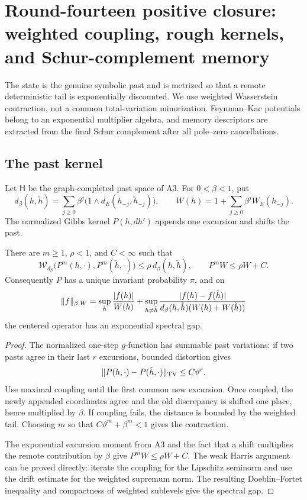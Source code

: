 
\section{Round-fourteen positive closure: weighted coupling, rough kernels, and Schur-complement memory}
\label{sec:r14-a4}

The state is the genuine symbolic past and is metrized so that a remote
deterministic tail is exponentially discounted.  We use weighted Wasserstein
contraction, not a common total-variation minorization.  Feynman--Kac
potentials belong to an exponential multiplier algebra, and memory
descriptors are extracted from the final Schur complement after all
pole--zero cancellations.

\subsection{The past kernel}

Let \(\mathsf H\) be the graph-completed past space of A3.  For
\(0<\beta<1\), put
\[
 d_\beta(h,\tilde h)
 =\sum_{j\ge0}\beta^j
  \bigl(1\wedge d_E(h_{-j},\tilde h_{-j})\bigr),
 \qquad
 W(h)=1+\sum_{j\ge0}\beta^jW_E(h_{-j}).
\]
The normalized Gibbs kernel \(P(h,dh')\) appends one excursion and shifts the
past.

\begin{theorem}
\label{thm:r14-a4-wasserstein}
There are \(m\ge1\), \(\rho<1\), and \(C<\infty\) such that
\[
 \mathcal W_{d_\beta}\bigl(P^m(h,\cdot),P^m(\tilde h,\cdot)\bigr)
 \le \rho\,d_\beta(h,\tilde h),
 \qquad
 P^mW\le \rho W+C .
\]
Consequently \(P\) has a unique invariant probability \(\pi\), and on
\[
 \|f\|_{\beta,W}
 =\sup_h{|f(h)|\over W(h)}
 +\sup_{h\ne\tilde h}
 {|f(h)-f(\tilde h)|\over d_\beta(h,\tilde h)(W(h)+W(\tilde h))}
\]
the centered operator has an exponential spectral gap.
\end{theorem}

\begin{proof}
The normalized one-step \(g\)-function has summable past variations:
if two pasts agree in their last \(r\) excursions, bounded distortion gives
\[
 \|P(h,\cdot)-P(\tilde h,\cdot)\|_{\rm TV}
 \le C\vartheta^r .
\]
Use maximal coupling until the first common new excursion.  Once coupled, the
newly appended coordinates agree and the old discrepancy is shifted one
place, hence multiplied by \(\beta\).  If coupling fails, the distance is
bounded by the weighted tail.  Choosing \(m\) so that
\(C\vartheta^m+\beta^m<1\) gives the contraction.

The exponential excursion moment from A3 and the fact that a shift multiplies
the remote contribution by \(\beta\) give
\(P^mW\le\rho W+C\).  The weak Harris argument can be proved directly:
iterate the coupling for the Lipschitz seminorm and use the drift estimate for
the weighted supremum norm.  The resulting Doeblin--Fortet inequality and
compactness of weighted sublevels give the spectral gap.
\end{proof}


